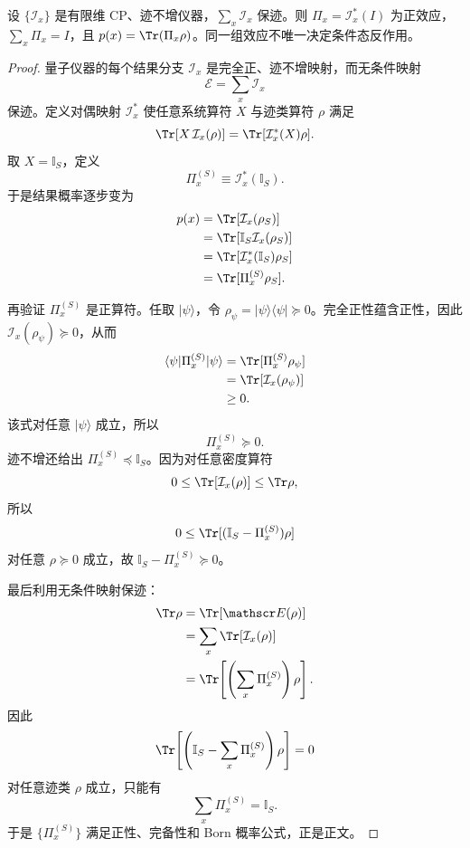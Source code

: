 \begin{theorem}
设 $\{\mathcal I_x\}$ 是有限维 CP、迹不增仪器，$\sum_x\mathcal I_x$ 保迹。则 $\Pi_x=\mathcal I_x^*(I)$ 为正效应，$\sum_x\Pi_x=I$，且 $p(x)=\Tr(\Pi_x\rho)$。同一组效应不唯一决定条件态反作用。
\end{theorem}
\begin{proof}
量子仪器的每个结果分支 $\mathcal I_x$ 是完全正、迹不增映射，而无条件映射
\[
\mathscr E=\sum_x\mathcal I_x
\]
保迹。定义对偶映射 $\mathcal I_x^*$ 使任意系统算符 $X$ 与迹类算符 $\rho$ 满足
\[
\Tr[X\,\mathcal I_x(\rho)]
=\Tr[\mathcal I_x^*(X)\rho].
\]
取 $X=\mathbb I_S$，定义
\[
\Pi_x^{(S)}\equiv\mathcal I_x^*(\mathbb I_S).
\]
于是结果概率逐步变为
\begin{align*}
p(x)
&=\Tr[\mathcal I_x(\rho_S)]\\
&=\Tr[\mathbb I_S\mathcal I_x(\rho_S)]\\
&=\Tr[\mathcal I_x^*(\mathbb I_S)\rho_S]\\
&=\Tr[\Pi_x^{(S)}\rho_S].
\end{align*}

再验证 $\Pi_x^{(S)}$ 是正算符。任取 $|\psi\rangle$，令
$\rho_\psi=|\psi\rangle\langle\psi|\succeq0$。完全正性蕴含正性，因此
$\mathcal I_x(\rho_\psi)\succeq0$，从而
\begin{align*}
\langle\psi|\Pi_x^{(S)}|\psi\rangle
&=\Tr[\Pi_x^{(S)}\rho_\psi]\\
&=\Tr[\mathcal I_x(\rho_\psi)]\\
&\ge0.
\end{align*}
该式对任意 $|\psi\rangle$ 成立，所以
\[
\Pi_x^{(S)}\succeq0.
\]
迹不增还给出 $\Pi_x^{(S)}\preceq \mathbb I_S$。因为对任意密度算符
\[
0\le\Tr[\mathcal I_x(\rho)]\le\Tr\rho,
\]
所以
\[
0\le\Tr[(\mathbb I_S-\Pi_x^{(S)})\rho]
\]
对任意 $\rho\succeq0$ 成立，故 $\mathbb I_S-\Pi_x^{(S)}\succeq0$。

最后利用无条件映射保迹：
\begin{align*}
\Tr\rho
&=\Tr[\mathscr E(\rho)]\\
&=\sum_x\Tr[\mathcal I_x(\rho)]\\
&=\Tr\!\left[\left(\sum_x\Pi_x^{(S)}\right)\rho\right].
\end{align*}
因此
\[
\Tr\!\left[\left(\mathbb I_S-\sum_x\Pi_x^{(S)}\right)\rho\right]=0
\]
对任意迹类 $\rho$ 成立，只能有
\[
\sum_x\Pi_x^{(S)}=\mathbb I_S.
\]
于是 $\{\Pi_x^{(S)}\}$ 满足正性、完备性和 Born 概率公式，正是正文。
\end{proof}


